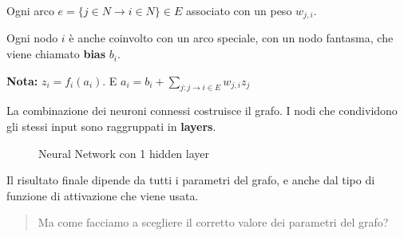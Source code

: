 Ogni arco $e = \{j \in N \rightarrow i \in N\} \in E$ associato con un peso
$w_{j,i}$.

Ogni nodo $i$ è anche coinvolto con un arco speciale, con un nodo fantasma, che
viene chiamato \textbf{bias} $b_i$.

\textbf{Nota:} $z_i = f_i(a_i)$. E $a_i = b_i  + \sum_{j:j\rightarrow i \in E} w_{j,i}z_j$

La combinazione dei neuroni connessi costruisce il grafo. I nodi che
condividono gli stessi input sono raggruppati in \textbf{layers}.

\usetikzlibrary{positioning}
\begin{figure}[H]
    \begin{center}

    \end{center}
    \caption{Neural Network con 1 hidden layer}
\end{figure}

Il risultato finale dipende da tutti i parametri del grafo, e anche dal tipo di
funzione di attivazione che viene usata.
\begin{quote}
    Ma come facciamo a scegliere il corretto valore dei parametri del grafo?
\end{quote}

